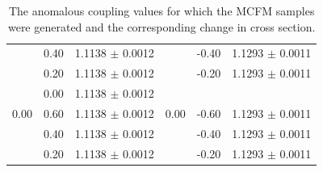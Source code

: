 \begin{table}[h]
\begin{center}
\begin{tabular}{l l c | l l c}
      & 0.40 & 1.1138 $\pm$ 0.0012 &       & -0.40 & 1.1293 $\pm$ 0.0011 \\ 
      & 0.20 & 1.1138 $\pm$ 0.0012 &       & -0.20 & 1.1293 $\pm$ 0.0011 \\ 
      & 0.00 & 1.1138 $\pm$ 0.0012 &       &       &                      \\ \hline
 0.00 & 0.60 & 1.1138 $\pm$ 0.0012 &  0.00 & -0.60 & 1.1293 $\pm$ 0.0011 \\ 
      & 0.40 & 1.1138 $\pm$ 0.0012 &       & -0.40 & 1.1293 $\pm$ 0.0011 \\ 
      & 0.20 & 1.1138 $\pm$ 0.0012 &       & -0.20 & 1.1293 $\pm$ 0.0011 \\ \hline
    \hline  
\end{tabular}
\end{center}
\caption{\label{tab:aTGC_generatedPoints}
The anomalous coupling values for which the MCFM samples were generated and the corresponding 
change in cross section.}
\end{table}
